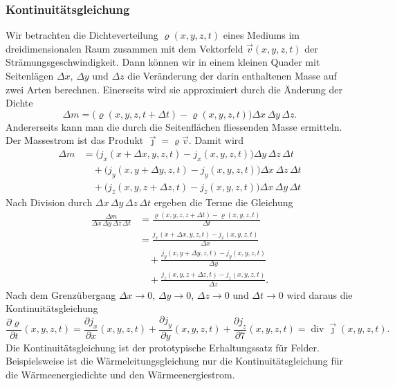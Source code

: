 \subsubsection{Kontinuitätsgleichung}
Wir betrachten die Dichteverteilung $\varrho(x,y,z,t)$ eines Mediums
im dreidimensionalen Raum zusammen mit dem Vektorfeld $\vec{v}(x,y,z,t)$
der Strämungsgeschwindigkeit.
Dann können wir in einem kleinen Quader mit Seitenlägen
$\Delta x$,
$\Delta y$
und
$\Delta z$
die Veränderung der darin enthaltenen Masse auf zwei Arten berechnen.
Einerseits wird sie approximiert durch die Änderung der Dichte
\[
\Delta m
=
\bigl(\varrho(x,y,z,t+\Delta t)-\varrho(x,y,z,t)\bigr)
\Delta x
\,
\Delta y
\,
\Delta z.
\]
Andererseits kann man die durch die Seitenflächen fliessenden Masse
ermitteln.
Der Massestrom ist das Produkt $\vec{\jmath}=\varrho\vec{v}$.
Damit wird
\begin{align*}
\Delta m
&=
\bigl(
j_x(x+\Delta x,y,z,t)
-
j_x(x,y,z,t)
\bigr)
\Delta y\,\Delta z \, \Delta t
\\
&\quad
+
\bigl(
j_y(x,y+\Delta y,z,t)
-
j_y(x,y,z,t)
\bigr)
\Delta x\,\Delta z \, \Delta t
\\
&\quad
+
\bigl(
j_z(x,y,z+\Delta z,t)
-
j_z(x,y,z,t)
\bigr)
\Delta x\,\Delta y \, \Delta t
\end{align*}
Nach Division durch $\Delta x\, \Delta y\, \Delta z\,\Delta t$ ergeben
die Terme die Gleichung
\begin{align*}
\frac{\Delta m}{\Delta x\,\Delta y\,\Delta z\,\Delta t}
&=
\frac{\varrho(x,y,z,z+\Delta t)-\varrho(x,y,z,t)}{\Delta t}
\\
&=
\frac{
j_x(x+\Delta x,y,z,t)
-
j_x(x,y,z,t)
}{
\Delta x
}
\\
&\quad
+
\frac{
j_y(x,y+\Delta y,z,t)
-
j_y(x,y,z,t)
}{
\Delta y
}
\\
&\quad
+
\frac{
j_z(x,y,z+\Delta z,t)
-
j_z(x,y,z,t)
}{
\Delta z
}.
\end{align*}
Nach dem Grenzübergang
$\Delta x\to 0$,
$\Delta y\to 0$,
$\Delta z\to 0$
und
$\Delta t\to 0$
wird daraus die Kontinuitätsgleichung
\begin{equation}
\frac{\partial \varrho}{\partial t}(x,y,z,t)
=
\frac{\partial j_x}{\partial x}(x,y,z,t)
+
\frac{\partial j_y}{\partial y}(x,y,z,t)
+
\frac{\partial j_z}{\partial 7}(x,y,z,t)
=
\operatorname{div}\vec{\jmath}(x,y,z,t).
\label{buch:symmetrien:felder:eqn:kontinuitaet}
\end{equation}
Die Kontinuitätsgleichung ist der prototypische Erhaltungssatz für
Felder.
Beispielsweise ist die Wärmeleitungsgleichung nur die Kontinuitätsgleichung
für die Wärmeenergiedichte und den Wärmeenergiestrom.

